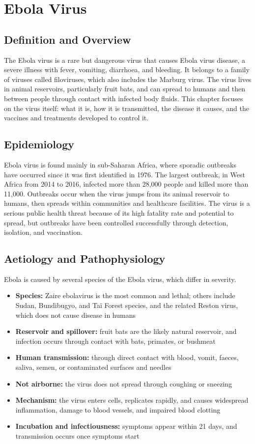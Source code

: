 \chapter{Ebola Virus}

\section*{Definition and Overview}
The Ebola virus is a rare but dangerous virus that causes Ebola virus disease, a severe illness with fever, vomiting, diarrhoea, and bleeding. It belongs to a family of viruses called filoviruses, which also includes the Marburg virus. The virus lives in animal reservoirs, particularly fruit bats, and can spread to humans and then between people through contact with infected body fluids. This chapter focuses on the virus itself: what it is, how it is transmitted, the disease it causes, and the vaccines and treatments developed to control it.

\section*{Epidemiology}
Ebola virus is found mainly in sub-Saharan Africa, where sporadic outbreaks have occurred since it was first identified in 1976. The largest outbreak, in West Africa from 2014 to 2016, infected more than 28,000 people and killed more than 11,000. Outbreaks occur when the virus jumps from its animal reservoir to humans, then spreads within communities and healthcare facilities. The virus is a serious public health threat because of its high fatality rate and potential to spread, but outbreaks have been controlled successfully through detection, isolation, and vaccination.

\section*{Aetiology and Pathophysiology}
Ebola is caused by several species of the Ebola virus, which differ in severity.
\begin{itemize}
    \item \textbf{Species:} Zaire ebolavirus is the most common and lethal; others include Sudan, Bundibugyo, and Taï Forest species, and the related Reston virus, which does not cause disease in humans
    \item \textbf{Reservoir and spillover:} fruit bats are the likely natural reservoir, and infection occurs through contact with bats, primates, or bushmeat
    \item \textbf{Human transmission:} through direct contact with blood, vomit, faeces, saliva, semen, or contaminated surfaces and needles
    \item \textbf{Not airborne:} the virus does not spread through coughing or sneezing
    \item \textbf{Mechanism:} the virus enters cells, replicates rapidly, and causes widespread inflammation, damage to blood vessels, and impaired blood clotting
    \item \textbf{Incubation and infectiousness:} symptoms appear within 21 days, and transmission occurs once symptoms start
\end{itemize}

